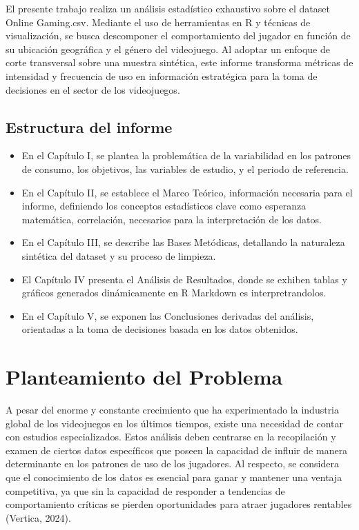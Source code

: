 \documentclass[oneside,11pt]{Latex/Classes/PhDthesisPSnPDF}
\begin{document}
El presente trabajo realiza un análisis estadístico exhaustivo sobre el
dataset Online Gaming.csv. Mediante el uso de herramientas en R y
técnicas de visualización, se busca descomponer el comportamiento del
jugador en función de su ubicación geográfica y el género del
videojuego. Al adoptar un enfoque de corte transversal sobre una muestra
sintética, este informe transforma métricas de intensidad y frecuencia
de uso en información estratégica para la toma de decisiones en el
sector de los videojuegos.

\section*{Estructura del informe}

\begin{itemize}
  \item{En el Capítulo I, se plantea la problemática de la variabilidad en los patrones de consumo, los objetivos, las variables de estudio, y el periodo de referencia.}
  \item{En el Capítulo II, se establece el Marco Teórico, información necesaria para el informe, definiendo los conceptos estadísticos clave como esperanza matemática, correlación, necesarios para la interpretación de los datos.}
  \item{En el Capítulo III, se describe las Bases Metódicas, detallando la naturaleza sintética del dataset y su proceso de limpieza. }
  \item{El Capítulo IV presenta el Análisis de Resultados, donde se exhiben tablas y gráficos generados dinámicamente en R Markdown es interpretrandolos.}
  \item{En el Capítulo V, se exponen las Conclusiones derivadas del análisis, orientadas a la toma de decisiones basada en los datos obtenidos.}
\end{itemize}

\chapter{Planteamiento del Problema}

A pesar del enorme y constante crecimiento que ha experimentado la
industria global de los videojuegos en los últimos tiempos, existe una
necesidad de contar con estudios especializados. Estos análisis deben
centrarse en la recopilación y examen de ciertos datos específicos que
poseen la capacidad de influir de manera determinante en los patrones de
uso de los jugadores. Al respecto, se considera que el conocimiento de
los datos es esencial para ganar y mantener una ventaja competitiva, ya
que sin la capacidad de responder a tendencias de comportamiento
críticas se pierden oportunidades para atraer jugadores rentables
(Vertica, 2024).\\
\end{document}
